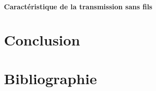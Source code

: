 \documentclass{rapportENS}
\begin{document}
 \subsection{Caractéristique de la transmission sans fils}
 
 
 \part{Conclusion}
 
 \part{Bibliographie}
\end{document}
